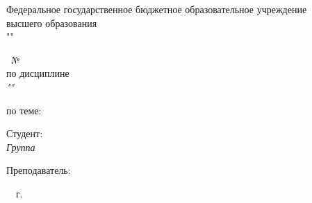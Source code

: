 \thispagestyle{empty}

\begin{center}
  \MakeUppercase{\cfgMinistry}

  \vspace{14pt}

  Федеральное государственное бюджетное образовательное учреждение\\
  высшего образования\\
  "\cfgUniversity"

  \vspace{14pt}

  \cfgDepartment
\end{center}

\vfill

\begin{center}
  \MakeUppercase{\cfgReportType}~№\,\cfgLabNumber\\
  по дисциплине\\
  \textit{"\cfgDiscipline"
}

  \vspace{20pt}

  по теме:\\
  {\large\MakeUppercase{\cfgTopic}}
\end{center}

\vfill

\noindent Студент:\\
\textit{Группа~\cfgGroup \hfill \cfgStudentShort}

\vspace{14pt}

\noindent Преподаватель:\\
\textit{\cfgTeacherRank \hfill \cfgTeacherShort}

\vfill

\begin{center}
  \cfgCity~\cfgYear~г.
\end{center}
\newpage
